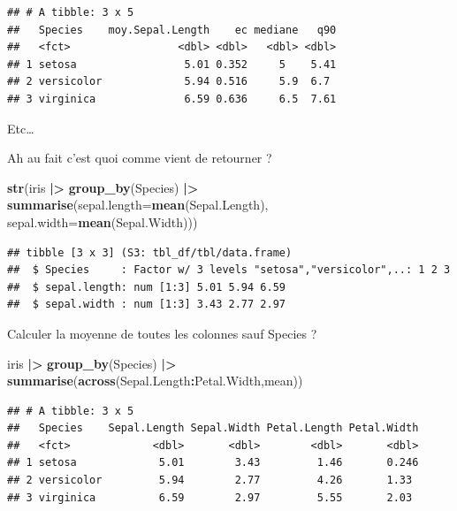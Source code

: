 \documentclass[
]{book}
\newenvironment{Shaded}{\begin{snugshade}}{\end{snugshade}}
\newcommand{\AttributeTok}[1]{\textcolor[rgb]{0.13,0.29,0.53}{#1}}
\newcommand{\FunctionTok}[1]{\textcolor[rgb]{0.13,0.29,0.53}{\textbf{#1}}}
\newcommand{\NormalTok}[1]{#1}
\newcommand{\SpecialCharTok}[1]{\textcolor[rgb]{0.81,0.36,0.00}{\textbf{#1}}}
\begin{document}
\begin{verbatim}
## # A tibble: 3 x 5
##   Species    moy.Sepal.Length    ec mediane   q90
##   <fct>                 <dbl> <dbl>   <dbl> <dbl>
## 1 setosa                 5.01 0.352     5    5.41
## 2 versicolor             5.94 0.516     5.9  6.7 
## 3 virginica              6.59 0.636     6.5  7.61
\end{verbatim}

Etc\ldots{}

Ah au fait c'est quoi comme vient de retourner ?

\begin{Shaded}
\begin{Highlighting}[]
\FunctionTok{str}\NormalTok{(iris }\SpecialCharTok{|\textgreater{}} \FunctionTok{group\_by}\NormalTok{(Species) }\SpecialCharTok{|\textgreater{}} \FunctionTok{summarise}\NormalTok{(}\AttributeTok{sepal.length=}\FunctionTok{mean}\NormalTok{(Sepal.Length),}
                                       \AttributeTok{sepal.width=}\FunctionTok{mean}\NormalTok{(Sepal.Width)))}
\end{Highlighting}
\end{Shaded}

\begin{verbatim}
## tibble [3 x 3] (S3: tbl_df/tbl/data.frame)
##  $ Species     : Factor w/ 3 levels "setosa","versicolor",..: 1 2 3
##  $ sepal.length: num [1:3] 5.01 5.94 6.59
##  $ sepal.width : num [1:3] 3.43 2.77 2.97
\end{verbatim}

Calculer la moyenne de toutes les colonnes sauf Species ?

\begin{Shaded}
\begin{Highlighting}[]
\NormalTok{iris }\SpecialCharTok{|\textgreater{}} \FunctionTok{group\_by}\NormalTok{(Species) }\SpecialCharTok{|\textgreater{}} \FunctionTok{summarise}\NormalTok{(}\FunctionTok{across}\NormalTok{(Sepal.Length}\SpecialCharTok{:}\NormalTok{Petal.Width,mean))}
\end{Highlighting}
\end{Shaded}

\begin{verbatim}
## # A tibble: 3 x 5
##   Species    Sepal.Length Sepal.Width Petal.Length Petal.Width
##   <fct>             <dbl>       <dbl>        <dbl>       <dbl>
## 1 setosa             5.01        3.43         1.46       0.246
## 2 versicolor         5.94        2.77         4.26       1.33 
## 3 virginica          6.59        2.97         5.55       2.03
\end{verbatim}
\end{document}

